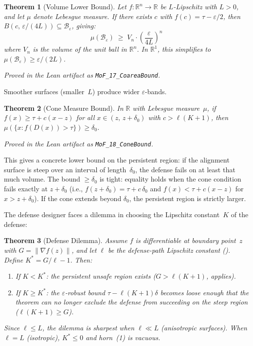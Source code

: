 \documentclass[11pt]{article}
\newtheorem{theorem}{Theorem}[section]
\newcommand{\R}{\mathbb{R}}
\begin{document}
\begin{theorem}[Volume Lower Bound]
\label{thm:coarea}
Let $f\colon \R^n \to \R$ be $L$-Lipschitz with $L > 0$, and let
$\mu$ denote Lebesgue measure. If there exists $c$ with
$f(c) = \tau - \varepsilon/2$, then
$B(c,\, \varepsilon/(4L)) \subseteq
\mathcal{B}_\varepsilon$, giving:
\begin{equation}
  \mu(\mathcal{B}_\varepsilon)
  \;\geq\; V_n \cdot \left(\frac{\varepsilon}{4L}\right)^{\!n}
\end{equation}
where $V_n$ is the volume of the unit ball in $\R^n$. In $\R^1$,
this simplifies to $\mu(\mathcal{B}_\varepsilon) \geq \varepsilon/(2L)$.
\end{theorem}

\noindent\emph{Proved in the Lean artifact as \textup{\texttt{MoF\_17\_CoareaBound}}.}

Smoother surfaces (smaller~$L$) produce wider $\varepsilon$-bands.

\begin{theorem}[Cone Measure Bound]
\label{thm:cone}
In $\R$ with Lebesgue measure~$\mu$, if
$f(x) \geq \tau + c(x - z)$ for all $x \in (z,\, z + \delta_0)$
with $c > \ell(K+1)$, then
$\mu(\{x : f(D(x)) > \tau\}) \geq \delta_0$.
\end{theorem}

\noindent\emph{Proved in the Lean artifact as \textup{\texttt{MoF\_18\_ConeBound}}.}

This gives a concrete lower bound on the persistent region: if the
alignment surface is steep over an interval of length~$\delta_0$, the
defense fails on at least that much volume. The bound $\geq \delta_0$
is tight: equality holds when the cone condition fails exactly at
$z + \delta_0$ (i.e., $f(z+\delta_0) = \tau + c\,\delta_0$ and
$f(x) < \tau + c(x-z)$ for $x > z + \delta_0$). If the cone extends
beyond $\delta_0$, the persistent region is strictly larger.

The defense designer faces a dilemma in choosing the Lipschitz
constant~$K$ of the defense:

\begin{theorem}[Defense Dilemma]
\label{thm:dilemma}
Assume $f$ is differentiable at boundary point~$z$ with
$G = \|\nabla f(z)\|$, and let $\ell$ be
the defense-path Lipschitz constant (). Define
$K^* = G/\ell - 1$. Then:
\begin{enumerate}[nosep]
  \item If $K < K^*$: the persistent unsafe region exists
    ($G > \ell(K+1)$,  applies).
  \item If $K \geq K^*$: the $\varepsilon$-robust bound
    $\tau - \ell(K+1)\delta$ becomes loose enough that the theorem
    can no longer exclude the defense from succeeding on the steep
    region ($\ell(K+1) \geq G$).
\end{enumerate}
Since $\ell \leq L$, the dilemma is sharpest when $\ell \ll L$
(anisotropic surfaces). When $\ell = L$ (isotropic), $K^* \leq 0$
and horn~(1) is vacuous.
\end{theorem}
\end{document}
